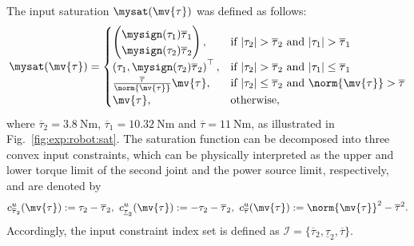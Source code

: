 \documentclass[letterpaper, journal]{IEEEtran}
\begin{document}
The input saturation $\mysat(\mv{\tau})$ was defined as follows:
\begin{equation} \label{eq:exp:sat}
  \mysat(\mv{\tau})
  =
  \begin{cases}
    \begin{pmatrix}
      \mysign(\tau_1)\overline{\tau}_1
      \\
      \mysign(\tau_2)\overline{\tau}_2
    \end{pmatrix}
    , &
    \text{if }
    \vert\tau_2\vert > \overline{\tau}_2
    \text{ and }
    \vert\tau_1\vert > \overline{\tau}_1
    \\
    \left(
      \tau_1
      , 
      \mysign(\tau_2)\overline{\tau}_2
    \right)^\top
    , &
    \text{if }
    \vert\tau_2\vert > \overline{\tau}_2
    \text{ and }
    \vert\tau_1\vert \le \overline{\tau}_1
    \\
    \tfrac{\overline{\tau}}{\norm{\mv{\tau}}}\mv{\tau}
    , &
    \text{if }
    |\tau_2| \le \overline{\tau}_2
    \text{ and }
    \norm{\mv{\tau}} > \overline{\tau}
    \\
    \mv{\tau}
    , &
    \text{otherwise}
    ,
  \end{cases}
\end{equation}
where $\overline{\tau}_2=\qty{3.8}{\newton\meter}$, $\overline{\tau}_1=\qty{10.32}{\newton\meter}$ and $\overline{\tau}=\qty{11}{\newton\meter}$, as illustrated in Fig.~\ref{fig:exp:robot:sat}.
The saturation function can be decomposed into three convex input constraints, which can be physically interpreted as the upper and lower torque limit of the second joint and the power source limit, respectively, and are denoted by
\begin{equation} \label{eq:val:cstr:input}
  c^u_{\overline{\tau}_2}(\mv{\tau}) 
  := 
  \tau_2 - \overline{\tau}_2
  ,
  \ 
  c^u_{\underline{\tau}_2}(\mv{\tau}) 
  := 
  -\tau_2 - \overline{\tau}_2
  ,
  \ 
  c^u_{\overline{\tau}}(\mv{\tau})
  := 
  \norm{\mv{\tau}}^2 - \overline{\tau}^2
  .
\end{equation}
Accordingly, the input constraint index set is defined as $\mathcal{I} = \{\overline{\tau}_2, \underline{\tau}_2, \overline{\tau}\}$.
\end{document}
